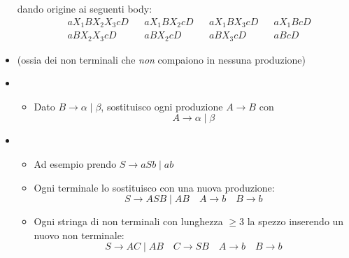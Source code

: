 \begin{itemize}
\begin{center}
\begin{tabular}{c c c c c c c}
			      \bottomrule
		      \end{tabular}
	      \end{center}
	      dando origine ai seguenti body:
	      \begin{align*}
		       & aX_1BX_2X_3cD                      &  & a    X_1    B    X_2          c  D   &  & a    X_1    B            X_3  c  D   &  & a    X_1    B                   c  D   \\
		       & a             B    X_2   X_3  c  D &  & a             B    X_2          c  D &  & a             B            X_3  c  D &  & a             B                   c  D
	      \end{align*}

	\item {} (ossia dei non terminali che \textit{non} compaiono in nessuna produzione)
	\item {}
	      \begin{itemize}
		      \item Dato $ B \rightarrow \alpha \mid \beta  $, sostituisco ogni produzione $ A \rightarrow B $ con
		            \[
			            A \rightarrow \alpha \mid \beta
		            \]
	      \end{itemize}
	\item {}
	      \begin{itemize}
		      \item Ad esempio prendo $ S \rightarrow a S b \mid a b $
		      \item Ogni terminale lo sostituisco con una nuova produzione:
		            \[
			            S \rightarrow ASB \mid AB \quad A \rightarrow b \quad B \rightarrow b
		            \]
		      \item Ogni stringa di non terminali con lunghezza $ \ge 3 $ la spezzo inserendo un nuovo non terminale:
		            \[
			            S \rightarrow AC \mid AB \quad C \rightarrow SB \quad A \rightarrow b \quad B \rightarrow b
		            \]
	      \end{itemize}
\end{itemize}
